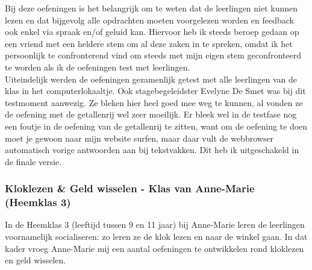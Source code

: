 \documentclass[a4paper,11pt]{article}
\theoremstyle{definition}
\begin{document}
\begin{itemize}
\begin{itemize}
\noindent Bij deze oefeningen is het belangrijk om te weten dat de leerlingen niet kunnen 
lezen en dat bijgevolg alle opdrachten moeten voorgelezen worden en feedback ook 
enkel via spraak en/of geluid kan. Hiervoor heb ik steeds beroep gedaan op een vriend 
met een heldere stem om al deze zaken in te spreken, omdat ik het persoonlijk te 
confronterend vind om steeds met mijn eigen stem geconfronteerd te worden als ik 
de oefeningen test met leerlingen. \\

\noindent Uiteindelijk werden de oefeningen gezamenlijk getest met alle 
leerlingen van de klas in het computerlokaaltje. Ook stagebegeleidster Evelyne De Smet was bij dit testmoment aanwezig.
 Ze bleken hier heel goed mee weg te kunnen, al vonden ze de oefening met de 
 getallenrij wel zeer moeilijk. Er bleek wel in de testfase nog een foutje in de 
 oefening van de getallenrij te zitten, want om de oefening te doen moet je gewoon naar mijn website surfen, 
maar daar vult de webbrowser automatisch vorige antwoorden aan bij tekstvakken. 
Dit heb ik uitgeschakeld in de finale versie.

\subsubsection{Kloklezen \& Geld wisselen - Klas van Anne-Marie (Heemklas 3)}
In de Heemklas 3 (leeftijd tussen 9 en 11 jaar) bij Anne-Marie leren de leerlingen 
voornamelijk socialiseren: zo leren ze de klok lezen en naar de winkel gaan. In 
dat kader vroeg Anne-Marie mij een aantal oefeningen te ontwikkelen rond 
kloklezen en geld wisselen.\\


\end{itemize}
\end{itemize}
\end{document}
